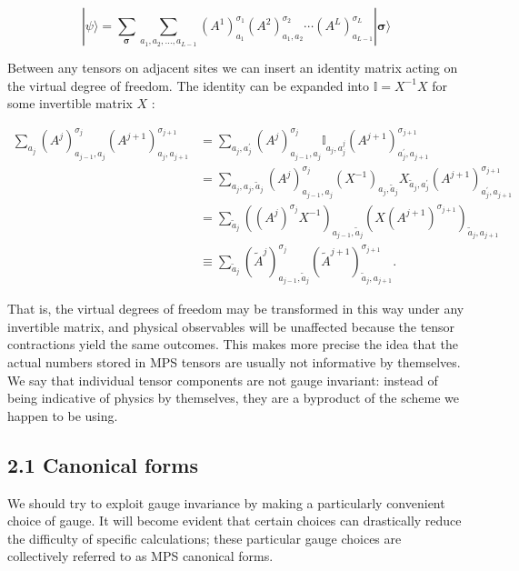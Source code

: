 \documentclass[12pt]{article}
\begin{document}
\begin{equation*}
|\psi\rangle=\sum_{\boldsymbol{\sigma}} \sum_{a_{1}, a_{2}, \ldots, a_{L-1}}\left(A^{1}\right)_{a_{1}}^{\sigma_{1}}\left(A^{2}\right)_{a_{1}, a_{2}}^{\sigma_{2}} \cdots\left(A^{L}\right)_{a_{L-1}}^{\sigma_{L}}|\boldsymbol{\sigma}\rangle \tag{1}
\end{equation*}


Between any tensors on adjacent sites we can insert an identity matrix acting on the virtual degree of freedom. The identity can be expanded into $\mathbb{I}=X^{-1} X$ for some invertible matrix $X$ :


\begin{align*}
\sum_{a_{j}}\left(A^{j}\right)_{a_{j-1}, a_{j}}^{\sigma_{j}}\left(A^{j+1}\right)_{a_{j}, a_{j+1}}^{\sigma_{j+1}} & =\sum_{a_{j}, a_{j}^{\prime}}\left(A^{j}\right)_{a_{j-1}, a_{j}}^{\sigma_{j}} \mathbb{I}_{a_{j}, a_{j}^{j}}\left(A^{j+1}\right)_{a_{j}^{\prime}, a_{j+1}}^{\sigma_{j+1}} \\
& =\sum_{a_{j}, a_{j}, \tilde{a}_{j}}\left(A^{j}\right)_{a_{j-1}, a_{j}}^{\sigma_{j}}\left(X^{-1}\right)_{a_{j}, \tilde{a}_{j}} X_{\tilde{a}_{j}, a_{j}^{\prime}}\left(A^{j+1}\right)_{a_{j}^{\prime}, a_{j+1}}^{\sigma_{j+1}} \\
& =\sum_{\tilde{a}_{j}}\left(\left(A^{j}\right)^{\sigma_{j}} X^{-1}\right)_{a_{j-1}, \tilde{a}_{j}}\left(X\left(A^{j+1}\right)^{\sigma_{j+1}}\right)_{\tilde{a}_{j}, a_{j+1}} \\
& \equiv \sum_{\tilde{a}_{j}}\left(\tilde{A}^{j}\right)_{a_{j-1}, \tilde{a}_{j}}^{\sigma_{j}}\left(\tilde{A}^{j+1}\right)_{\tilde{a}_{j}, a_{j+1}}^{\sigma_{j+1}} . \tag{2}
\end{align*}


That is, the virtual degrees of freedom may be transformed in this way under any invertible matrix, and physical observables will be unaffected because the tensor contractions yield the same outcomes. This makes more precise the idea that the actual numbers stored in MPS tensors are usually not informative by themselves. We say that individual tensor components are not gauge invariant: instead of being indicative of physics by themselves, they are a byproduct of the scheme we happen to be using.

\subsection*{2.1 Canonical forms}
We should try to exploit gauge invariance by making a particularly convenient choice of gauge. It will become evident that certain choices can drastically reduce the difficulty of specific calculations; these particular gauge choices are collectively referred to as MPS canonical forms.
\end{document}
